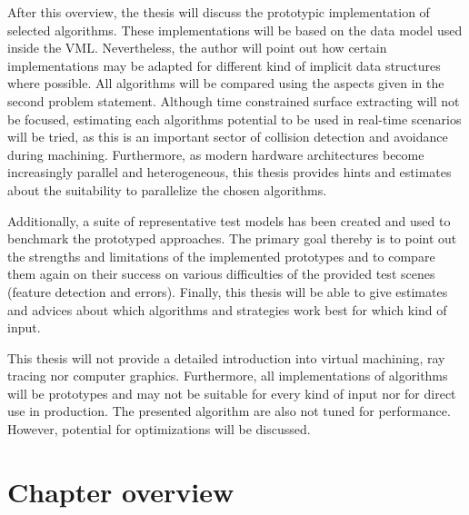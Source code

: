 After this overview, the thesis will discuss the prototypic implementation of selected algorithms.
These implementations will be based on the data model used inside the VML.
Nevertheless, the author will point out how certain implementations may be adapted for different kind of implicit data structures where possible.
All algorithms will be compared using the aspects given in the second problem statement.
Although time constrained surface extracting will not be focused, estimating each algorithms potential to be used in real-time scenarios will be tried, as this is an important sector of collision detection and avoidance during machining.
Furthermore, as modern hardware architectures become increasingly parallel and heterogeneous, this thesis provides hints and estimates about the suitability to parallelize the chosen algorithms.

Additionally, a suite of representative test models has been created and used to benchmark the prototyped approaches.
The primary goal thereby is to point out the strengths and limitations of the implemented prototypes and to compare them again on their success on various difficulties of the provided test scenes (\eg feature detection and errors).
Finally, this thesis will be able to give estimates and advices about which algorithms and strategies work best for which kind of input.

This thesis will not provide a detailed introduction into virtual machining, ray tracing nor computer graphics.
Furthermore, all implementations of algorithms will be prototypes and may not be suitable for every kind of input nor for direct use in production.
The presented algorithm are also not tuned for performance.
However, potential for optimizations will be discussed.


\section{Chapter overview}
\label{sec:chapter_overview}

